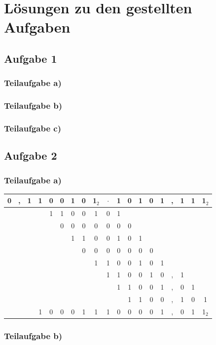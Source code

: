 \documentclass{llncs}
\begin{document}
\chapter*{L\"osungen zu den gestellten Aufgaben}

\section*{Aufgabe 1}

\subsection*{Teilaufgabe a)}
\subsection*{Teilaufgabe b)}
\subsection*{Teilaufgabe c)}

\section*{Aufgabe 2}
\subsection*{Teilaufgabe a)}

\begin{tabular}{ccccccccccccccccccc}
0&,&1&1&0&0&1&0&1$_2$&$\cdot$&1&0&1&0&1&,&1&1&1$_2$\\
\hline
 & & & &1&1&0&0&1&0      &1& & & & & & & & \\
 & & & & &0&0&0&0&0      &0&0& & & & & & & \\
 & & & & & &1&1&0&0      &1&0&1& & & & & & \\
 & & & & & & &0&0&0      &0&0&0&0& & & & & \\
 & & & & & & & &1&1      &0&0&1&0&1& & & & \\
 & & & & & & & & &1      &1&0&0&1&0&,&1& & \\
 & & & & & & & & &       &1&1&0&0&1&,&0&1& \\
 & & & & & & & & &       & &1&1&0&0&,&1&0&1\\
\hline
 & & &1&0&0&0&1&1&1      &0&0&0&0&1&,&0&1&1$_2$\\
\end{tabular}

\subsection*{Teilaufgabe b)}
\end{document}
